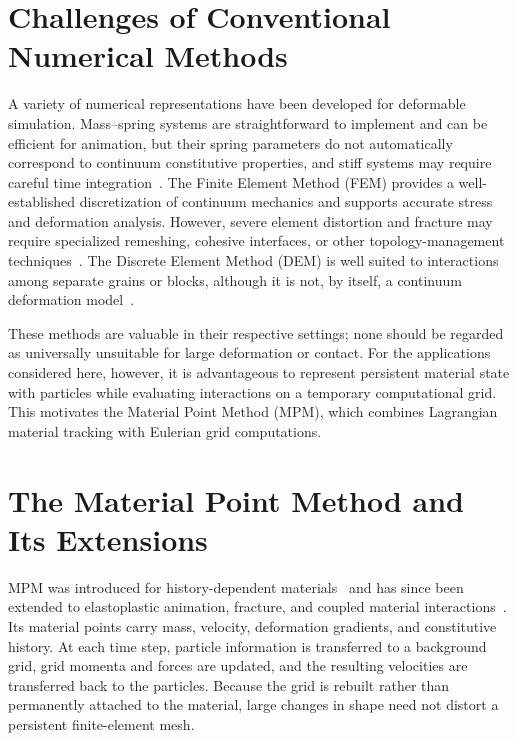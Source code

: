 \section{Challenges of Conventional Numerical Methods}
    A variety of numerical representations have been developed for deformable simulation. Mass--spring systems are straightforward to implement and can be efficient for animation, but their spring parameters do not automatically correspond to continuum constitutive properties, and stiff systems may require careful time integration~\citep{10.1145/37402.37427,10.1145/280814.280821,10.1145/1198555.1198573}. The Finite Element Method (FEM) provides a well-established discretization of continuum mechanics and supports accurate stress and deformation analysis. However, severe element distortion and fracture may require specialized remeshing, cohesive interfaces, or other topology-management techniques~\citep{10.1145/566570.566579}. The Discrete Element Method (DEM) is well suited to interactions among separate grains or blocks, although it is not, by itself, a continuum deformation model~\citep{cundall1979discrete}.
    
    These methods are valuable in their respective settings; none should be regarded as universally unsuitable for large deformation or contact. For the applications considered here, however, it is advantageous to represent persistent material state with particles while evaluating interactions on a temporary computational grid. This motivates the Material Point Method (MPM), which combines Lagrangian material tracking with Eulerian grid computations.
    
\section{The Material Point Method and Its Extensions}
    MPM was introduced for history-dependent materials~\citep{sulsky1994particle} and has since been extended to elastoplastic animation, fracture, and coupled material interactions~\citep{2013-mpm,2019-cdmpm,de2020material}. Its material points carry mass, velocity, deformation gradients, and constitutive history. At each time step, particle information is transferred to a background grid, grid momenta and forces are updated, and the resulting velocities are transferred back to the particles. Because the grid is rebuilt rather than permanently attached to the material, large changes in shape need not distort a persistent finite-element mesh.
    

